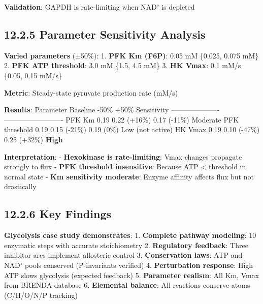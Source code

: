 \textbf{Validation}: GAPDH is rate-limiting when NAD⁺ is depleted \checkmark

\hypertarget{parameter-sensitivity-analysis}{%
\subsection{12.2.5 Parameter Sensitivity
Analysis}\label{parameter-sensitivity-analysis}}

\textbf{Varied parameters} (±50\%): 1. \textbf{PFK Km (F6P)}: 0.05 mM \textrightarrow
\{0.025, 0.075 mM\} 2. \textbf{PFK ATP threshold}: 3.0 mM \textrightarrow \{1.5, 4.5
mM\} 3. \textbf{HK Vmax}: 0.1 mM/s \textrightarrow \{0.05, 0.15 mM/s\}

\textbf{Metric}: Steady-state pyruvate production rate (mM/s)

\textbf{Results}: \textbar{} Parameter \textbar{} Baseline \textbar{}
-50\% \textbar{} +50\% \textbar{} Sensitivity \textbar{}
\textbar-----------\textbar----------\textbar------\textbar------\textbar-------------\textbar{}
\textbar{} PFK Km \textbar{} 0.19 \textbar{} 0.22 (+16\%) \textbar{}
0.17 (-11\%) \textbar{} Moderate \textbar{} \textbar{} PFK threshold
\textbar{} 0.19 \textbar{} 0.15 (-21\%) \textbar{} 0.19 (0\%) \textbar{}
Low (not active) \textbar{} \textbar{} HK Vmax \textbar{} 0.19
\textbar{} 0.10 (-47\%) \textbar{} 0.25 (+32\%) \textbar{} \textbf{High}
\textbar{}

\textbf{Interpretation}: - \textbf{Hexokinase is rate-limiting}: Vmax
changes propagate strongly to flux - \textbf{PFK threshold insensitive}:
Because ATP \textless{} threshold in normal state - \textbf{Km
sensitivity moderate}: Enzyme affinity affects flux but not drastically

\hypertarget{key-findings}{%
\subsection{12.2.6 Key Findings}\label{key-findings}}

\textbf{Glycolysis case study demonstrates}: 1. \textbf{Complete pathway
modeling}: 10 enzymatic steps with accurate stoichiometry 2.
\textbf{Regulatory feedback}: Three inhibitor arcs implement allosteric
control 3. \textbf{Conservation laws}: ATP and NAD⁺ pools conserved
(P-invariants verified) 4. \textbf{Perturbation response}: High ATP
slows glycolysis (expected feedback) 5. \textbf{Parameter realism}: All
Km, Vmax from BRENDA database 6. \textbf{Elemental balance}: All
reactions conserve atoms (C/H/O/N/P tracking)

